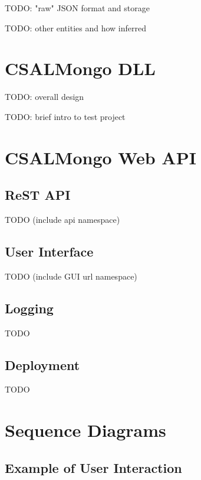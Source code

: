 \documentclass[letterpaper,10pt]{article}
\begin{document}
TODO: "raw" JSON format and storage

TODO: other entities and how inferred


\section{CSALMongo DLL}

TODO: overall design

TODO: brief intro to test project


\section{CSALMongo Web API}
\label{sec:webapi}

\subsection{ReST API}

TODO (include api namespace)

\subsection{User Interface}

TODO (include GUI url namespace)

\subsection{Logging}

TODO

\subsection{Deployment}
\label{subsec:deploy}
TODO


\section{Sequence Diagrams}

\subsection{Example of User Interaction}
\end{document}
